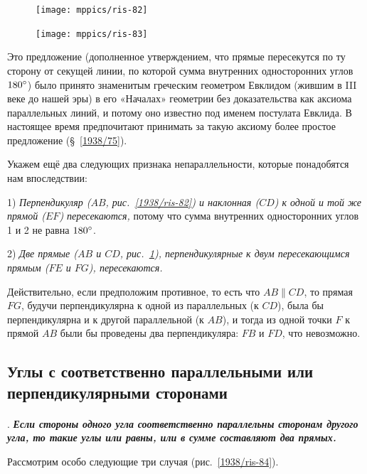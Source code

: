 \documentclass[twoside]{book}
\begin{document}
{

\begin{figure}
\centering
\texttt{[image: mppics/ris-82]}
\caption{}\label{1938/ris-82}
\bigskip
\texttt{[image: mppics/ris-83]}
\caption{}\label{1938/ris-83}
\end{figure}

Это предложение (дополненное утверждением, что прямые пересекутся по ту сторону от секущей линии, по которой сумма внутренних односторонних углов  $180\degree$) было принято знаменитым греческим геометром Евклидом (жившим в III веке до нашей эры) в его «Началах» геометрии без доказательства как аксиома параллельных линий, и потому оно известно под именем постулата Евклида.
В настоящее время предпочитают принимать за такую аксиому более простое предложение (§~\ref{1938/75}).

Укажем ещё два следующих признака непараллельности, которые понадобятся нам впоследствии:

1) \emph{Перпендикуляр \emph{($AB$, рис.~\ref{1938/ris-82})} и наклонная \emph{($CD$)} к одной и той же прямой \emph{($EF$)} пересекаются,} потому что сумма внутренних односторонних углов 1 и 2 не равна $180\degree$.

2) \emph{Две прямые \emph{($AB$ и $CD$, рис.~\ref{1938/ris-83}),} перпендикулярные к двум пересекающимся прямым \emph{($FE$ и $FG$),} пересекаются.}

Действительно, если предположим противное, то есть
что $AB \parallel CD$, то прямая $FG$, будучи перпендикулярна к одной из параллельных (к $CD$), была бы перпендикулярна и к другой параллельной (к $AB$), и тогда из одной точки $F$ к прямой $AB$ были бы проведены два перпендикуляра:
$FB$ и $FD$, что невозможно.

}

\subsection*{Углы с соответственно параллельными или перпендикулярными сторонами}

\paragraph{}\label{1938/79}
.
\textbf{\emph{Если стороны одного угла соответственно параллельны сторонам другого угла, то такие углы или равны, или в сумме составляют два прямых.}}

Рассмотрим особо следующие три случая (рис.~\ref{1938/ris-84}).
\end{document}

